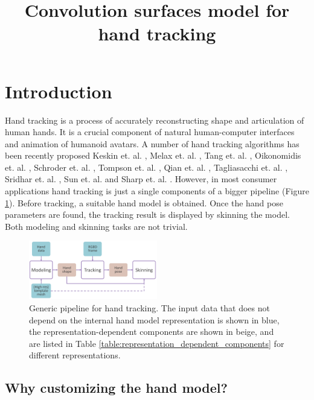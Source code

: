 \documentclass[10pt,journal,a4paper]{IEEEtran}
\title{Convolution surfaces model  for hand tracking}
\begin{document}
\maketitle

\section{Introduction}

Hand tracking is a process of accurately reconstructing shape and articulation of human hands. It is a crucial component of natural human-computer interfaces and animation of humanoid avatars. A number of hand tracking algorithms has been recently proposed  Keskin et. al. \cite{keskin2012hand}, Melax et. al. \cite{melax2013dynamics}, Tang et. al. \cite{tang2013real}, Oikonomidis et. al. \cite{oikonomidis2014evolutionary}, Schroder et. al. \cite{schroder2014real},
Tompson et. al. \cite{tompson2014real}, Qian et. al. \cite{qian2014realtime},  Tagliasacchi et. al. \cite{tagliasacchi2015robust}, Sridhar et. al. \cite{sridhar2015fast}, Sun et. al. \cite{sun2015cascaded} and Sharp et. al. \cite{sharp2015accurate}.
However, in most consumer applications hand tracking is just a single components of a bigger pipeline (Figure \ref{fig:generic_pipeline}). Before tracking, a suitable hand model is obtained. Once the hand pose parameters are found, the tracking result is displayed by skinning the model. Both modeling and skinning tasks are not trivial.

\begin{figure}[h!] 
	\centering
	\includegraphics[width=0.5\textwidth]{figures/generic_pipeline}
	\caption{Generic pipeline for hand tracking. The input data that does not depend on the internal hand model representation is shown in blue, the representation-dependent components are shown in beige, and are listed in Table \ref{table:representation_dependent_components} for different representations.}
	\label{fig:generic_pipeline}
\end{figure}


\subsection{Why customizing the hand model?}
\end{document}
